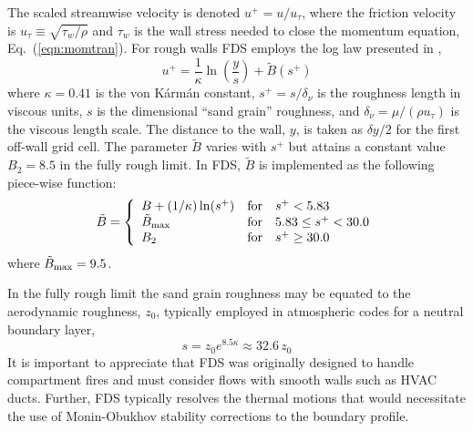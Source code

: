 \documentclass[journal,article,atmosphere,submit,moreauthors,pdftex]{Definitions/mdpi}
\begin{document}
The scaled streamwise velocity is denoted $u^+ = u/u_\tau$, where the friction velocity is $u_\tau \equiv \sqrt{\tau_w/\rho}$ and $\tau_w$ is the wall stress needed to close the momentum equation, Eq.~(\ref{eqn:momtran}).  For rough walls FDS employs the log law presented in \cite{Pope:2000},
\begin{equation}
\label{eqn_roughwallloglaw}
u^+ = \frac{1}{\kappa} \ln \left(\frac{y}{s}\right) + \tilde{B}(s^+)
\end{equation}
where $\kappa = 0.41$ is the von K\'arm\'an constant, $s^+ = s/\delta_\nu$ is the roughness length in viscous units, $s$ is the dimensional ``sand grain'' roughness, and $\delta_\nu = \mu/(\rho u_\tau)$ is the viscous length scale. The distance to the wall, $y$, is taken as $\delta y/2$ for the first off-wall grid cell.  The parameter $\tilde{B}$ varies with $s^+$ but attains a constant value $B_2=8.5$ in the fully rough limit.  In FDS, $\tilde{B}$ is implemented as the following piece-wise function:
\begin{equation}
\tilde{B} = \left\{ \begin{array}{lll} B + (1/\kappa)\ln(s^+) & \mbox{for} & s^+ < 5.83 \\
\tilde{B}_{\rm max} & \mbox{for} & 5.83 \le s^+ < 30.0 \\
B_2 & \mbox{for} & s^+ \ge 30.0 \end{array} \right.
\end{equation}
where $\tilde{B}_{\rm max} = 9.5$.

In the fully rough limit the sand grain roughness may be equated to the aerodynamic roughness, $z_0$, typically employed in atmospheric codes for a neutral boundary layer,
\begin{equation}
s = z_0 e^{8.5 \kappa} \approx 32.6 \, z_0
\end{equation}
It is important to appreciate that FDS was originally designed to handle compartment fires and must consider flows with smooth walls such as HVAC ducts.  Further, FDS typically resolves the thermal motions that would necessitate the use of Monin-Obukhov stability corrections to the boundary profile.
\end{document}
